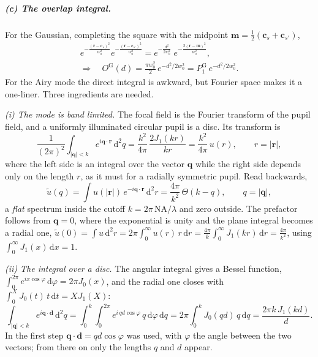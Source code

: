 \subparagraph{(c) The overlap integral.}
For the Gaussian, completing the square with the midpoint
$\mathbf m=\tfrac12(\mathbf c_s+\mathbf c_{s'})$,
\begin{gather}
e^{-\frac{(\mathbf r-\mathbf c_s)^2}{w_0^2}}
e^{-\frac{(\mathbf r-\mathbf c_{s'})^2}{w_0^2}}
=e^{-\frac{d^2}{2w_0^2}}\;e^{-\frac{2(\mathbf r-\mathbf m)^2}{w_0^2}},\\
\Longrightarrow\quad
O^\mathrm{G}(d)=\frac{\pi w_0^2}{2}\,e^{-d^2/2w_0^2}
=P_1^\mathrm{G}\,e^{-d^2/2w_0^2}.
\end{gather}
For the Airy mode the direct integral is awkward, but Fourier space makes it a
one-liner. Three ingredients are needed.

\emph{(i) The mode is band limited.} The focal field is the Fourier transform
of the pupil field, and a uniformly illuminated circular pupil is a disc. Its
transform is
\begin{equation}
\frac{1}{(2\pi)^2}\int_{|\mathbf q|<k}\! e^{i\mathbf q\cdot\mathbf r}\,\mathrm d^2q
=\frac{k^2}{4\pi}\,\frac{2J_1(kr)}{kr}
=\frac{k^2}{4\pi}\,u(r),\qquad r=|\mathbf r| ,
\end{equation}
where the left side is an integral over the vector $\mathbf q$ while the right
side depends only on the length $r$, as it must for a radially symmetric
pupil. Read backwards,
\begin{equation}
\tilde u(q)=\int\! u(|\mathbf r|)\,e^{-i\mathbf q\cdot\mathbf r}\,\mathrm d^2r
=\frac{4\pi}{k^2}\,\Theta\!\left(k-q\right),
\qquad q=|\mathbf q| ,
\end{equation}
a \emph{flat} spectrum inside the cutoff $k=2\pi\,\mathrm{NA}/\lambda$ and zero
outside. The prefactor follows from $\mathbf q=0$, where the exponential is unity and
the plane integral becomes a radial one,
$\tilde u(0)=\int u\,\mathrm d^2r=2\pi\int_0^\infty u(r)\,r\,\mathrm dr
=\frac{4\pi}{k}\int_0^\infty J_1(kr)\,\mathrm dr=\frac{4\pi}{k^2}$,
using $\int_0^\infty J_1(x)\,\mathrm dx=1$.

\emph{(ii) The integral over a disc.} The angular integral gives a Bessel
function, $\int_0^{2\pi}e^{ix\cos\varphi}\,\mathrm d\varphi=2\pi J_0(x)$, and
the radial one closes with $\int_0^XJ_0(t)\,t\,\mathrm dt=XJ_1(X)$:
\begin{equation}
\int_{|\mathbf q|<k}\! e^{i\mathbf q\cdot\mathbf d}\,\mathrm d^2q
=\int_0^k\!\!\int_0^{2\pi}\! e^{i\,qd\cos\varphi}\,q\,\mathrm d\varphi\,\mathrm dq
=2\pi\!\int_0^k\! J_0(qd)\,q\,\mathrm dq
=\frac{2\pi k\,J_1(kd)}{d} .
\end{equation}
In the first step $\mathbf q\cdot\mathbf d=qd\cos\varphi$ was used, with
$\varphi$ the angle between the two vectors; from there on only the lengths
$q$ and $d$ appear.


